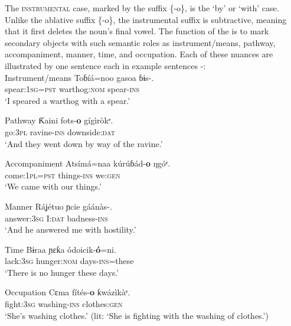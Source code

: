 The \textsc{instrumental} case, marked by the suffix \{-o\}, is the ‘by’ or ‘with’ case. Unlike the ablative suffix \{-o\}, the instrumental suffix is subtractive, meaning that it first deletes the noun’s final vowel. The function of the  is to mark secondary objects with such semantic roles as instrument/means, pathway, accompaniment, manner, time, and occupation. Each of these nuances are illustrated by one sentence each in example sentences -:\\




Instrument/means
\ea\label{ex:case:31}
\gll Toɓíá=noo     gasoa       ɓɨs-\textbf{\ᵓ}. \\
spear:\textsc{1sg}=\textsc{pst}   warthog:\textsc{nom}   spear-\textsc{ins}    \\
\glt ‘I speared a warthog with a spear.’ 
\z




Pathway
\ea\label{ex:case:32}
\gll Ƙaini     fots-\textbf{o}     gígìròkᵉ. \\
go:\textsc{3pl}   ravine-\textsc{ins}   downside:\textsc{dat}    \\
\glt ‘And they went down by way of the ravine.’ 
\z



Accompaniment
\ea\label{ex:case:33}
\gll Atsímá=naa     kúrúɓád-\textbf{o}   ŋgóᵉ. \\
come:\textsc{1pl}=\textsc{pst}   things-\textsc{ins}   we:\textsc{gen}    \\
\glt ‘We came with our things.’ 
\z




Manner
\ea\label{ex:case:34}
\gll Ráʝétuo   ɲcie   gáánàs-\textbf{\ᵓ}. \\
answer:\textsc{3sg}   I:\textsc{dat}   badness-\textsc{ins}    \\
\glt ‘And he answered me with hostility.’ 
\z




Time
\ea\label{ex:case:35}
\gll Bɨraa     ɲɛƙa     ódoicik-\textbf{ó}=ni. \\
lack:\textsc{3sg}   hunger:\textsc{nom}   days-\textsc{ins}=these    \\
\glt ‘There is no hunger these days.’ 
\z




Occupation
\ea\label{ex:case:36}
\gll Cɛma     fítés-\textbf{o}   ƙwázìkàᵉ. \\
fight:\textsc{3sg}   washing-\textsc{ins}   clothes:\textsc{gen}    \\
\glt ‘She’s washing clothes.’ (lit: ‘She is fighting with the washing of clothes.’) 
\z






